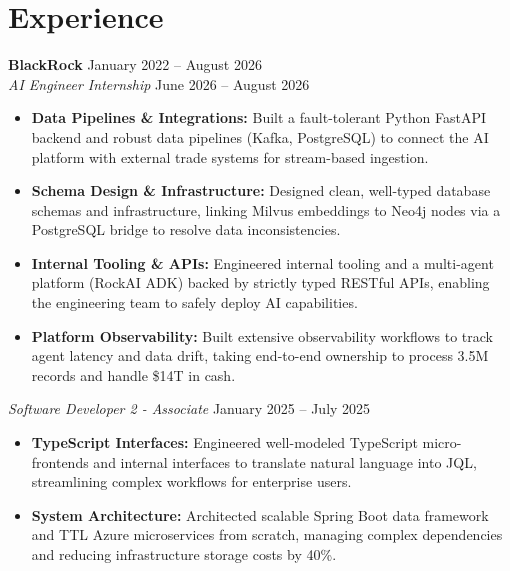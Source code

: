 \documentclass[11pt,a4paper]{article}
\begin{document}
\section{Experience}
\noindent
\textbf{BlackRock} \hfill January 2022 -- August 2026 \\
\textit{AI Engineer Internship} \hfill June 2026 -- August 2026
\begin{itemize}[leftmargin=*,noitemsep,topsep=0pt]
    \item \textbf{Data Pipelines \& Integrations:} Built a fault-tolerant Python FastAPI backend and robust data pipelines (Kafka, PostgreSQL) to connect the AI platform with external trade systems for stream-based ingestion.
    \item \textbf{Schema Design \& Infrastructure:} Designed clean, well-typed database schemas and infrastructure, linking Milvus embeddings to Neo4j nodes via a PostgreSQL bridge to resolve data inconsistencies.
    \item \textbf{Internal Tooling \& APIs:} Engineered internal tooling and a multi-agent platform (RockAI ADK) backed by strictly typed RESTful APIs, enabling the engineering team to safely deploy AI capabilities.
    \item \textbf{Platform Observability:} Built extensive observability workflows to track agent latency and data drift, taking end-to-end ownership to process 3.5M records and handle \$14T in cash.
\end{itemize}

\vspace{3pt}
\noindent
\textit{Software Developer 2 - Associate} \hfill January 2025 -- July 2025
\begin{itemize}[leftmargin=*,noitemsep,topsep=0pt]
    \item \textbf{TypeScript Interfaces:} Engineered well-modeled TypeScript micro-frontends and internal interfaces to translate natural language into JQL, streamlining complex workflows for enterprise users.
    \item \textbf{System Architecture:} Architected scalable Spring Boot data framework and TTL Azure microservices from scratch, managing complex dependencies and reducing infrastructure storage costs by 40\%.
\end{itemize}
\end{document}
